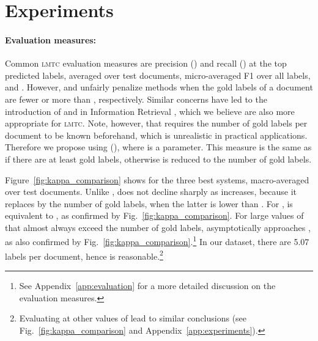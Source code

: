 \documentclass[11pt,a4paper]{article}
\newcommand{\lmtc}{\textsc{lmtc}\xspace}
\begin{document}
\section{Experiments}
\label{sec:experiments}

\paragraph{Evaluation measures:} Common \lmtc evaluation measures are precision () and recall () at the top  predicted labels, averaged over test documents, micro-averaged F1 over all labels, and  \cite{Manning2009}. However,  and  unfairly penalize methods when the gold labels of a document are fewer or more than , respectively. Similar concerns have led to the introduction of  and  in Information Retrieval \cite{Manning2009}, which we believe are also more appropriate for \lmtc. Note, however, that  requires the number of gold labels per document to be known beforehand, which is unrealistic in practical applications. Therefore we propose using  (), where  is a parameter. This measure is the same as  if there are at least  gold labels, otherwise  is reduced to the number of gold labels. 

Figure~\ref{fig:kappa_comparison} shows  for the three best systems, macro-averaged over test documents. Unlike ,  does not decline sharply as  increases, because it replaces  by the number of gold labels, when the latter is lower than . 
For ,  is equivalent to , as confirmed by Fig.~\ref{fig:kappa_comparison}. For large values of  that almost always exceed the number of gold labels,  asymptotically approaches , as also confirmed by Fig.~\ref{fig:kappa_comparison}.\footnote{See Appendix~\ref{app:evaluation} for a more detailed discussion on the evaluation measures.} In our dataset, there are 5.07 labels per document, hence   is reasonable.\footnote{Evaluating at other values of  lead to similar conclusions (see Fig.~\ref{fig:kappa_comparison} and Appendix~\ref{app:experiments}).}
\end{document}
